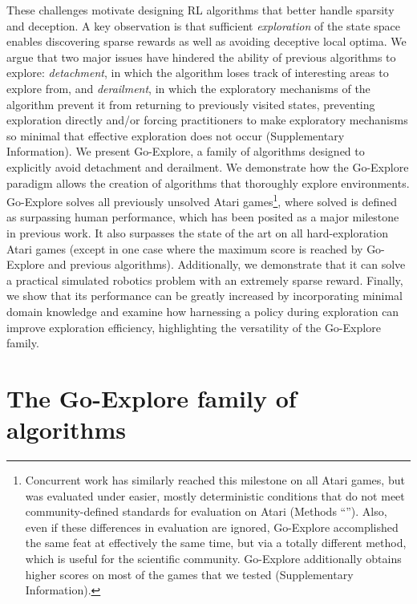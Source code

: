 \documentclass{nature}
\renewcommand*{\cite}[1]{\supercite{#1}}
\begin{document}
These challenges motivate designing RL algorithms that better handle sparsity and deception.
A key observation is that sufficient \emph{exploration} of the state space enables discovering sparse rewards as well as avoiding deceptive local optima\cite{lehman2011abandoning, conti2018improving}. 
We argue that two major issues have hindered the ability of previous algorithms to explore: \emph{detachment}, in which the algorithm loses track of interesting areas to explore from, 
and \emph{derailment}, in which the exploratory mechanisms of the algorithm prevent it from returning to previously visited states, preventing exploration directly and/or forcing practitioners to make exploratory mechanisms so minimal that effective exploration does not occur (Supplementary Information).
We present Go-Explore, a family of algorithms designed to explicitly avoid detachment and derailment.
We demonstrate how the Go-Explore paradigm allows the creation of algorithms that thoroughly explore environments. 
Go-Explore solves all previously unsolved Atari games\footnote{Concurrent work\cite{badia2020agent57} has similarly reached this milestone on all Atari games, but was evaluated under easier, mostly deterministic conditions that do not meet community-defined standards\cite{Machado2018RevisitingTA} for evaluation on Atari (Methods ``''). Also, even if these differences in evaluation are ignored, Go-Explore accomplished the same feat at effectively the same time, but via a totally different method, which is useful for the scientific community. Go-Explore additionally obtains higher scores on most of the games that we tested (Supplementary Information).}, where solved is defined as surpassing human performance, which has been posited as a major milestone in previous work\cite{mnih:nature15, aytar2018playing, badia2020agent57}.
It also surpasses the state of the art on all hard-exploration Atari games (except in one case where the maximum score is reached by Go-Explore and previous algorithms).
Additionally, we demonstrate that it can solve a practical simulated robotics problem with an extremely sparse reward.
Finally, we show that its performance can be greatly increased by incorporating minimal domain knowledge and examine how harnessing a policy during exploration can improve exploration efficiency, highlighting the versatility of the Go-Explore family.

\section*{The Go-Explore family of algorithms}
\label{sec:goexplore_family}
\end{document}
